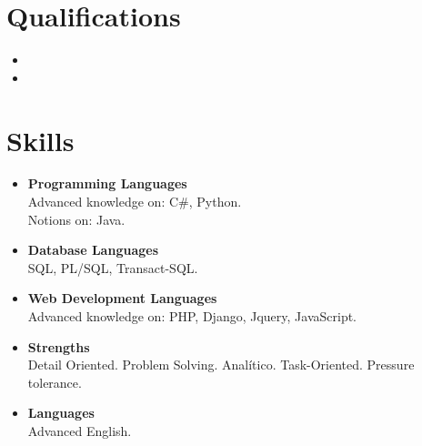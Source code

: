 \documentclass[11pt,a4paper,roman]{moderncv}        %
\begin{document}
\section{Qualifications}

\vspace{3pt}

\begin{itemize}

\item{}

\item{}

\end{itemize}

\section{Skills}

\vspace{3pt}

\begin{itemize}

\item \textbf{Programming Languages} \\Advanced knowledge on: C\#, Python. \\Notions on: Java.

\vspace{3pt}

\item \textbf{Database Languages} \\SQL, PL/SQL, Transact-SQL.

\vspace{3pt}

\item \textbf{Web Development Languages} \\Advanced knowledge on: PHP, Django, Jquery, JavaScript.

\vspace{3pt}

\item \textbf{Strengths} \\Detail Oriented. Problem Solving. Analítico. Task-Oriented. Pressure tolerance.

\vspace{3pt}

\item \textbf{Languages} \\Advanced English.

\end{itemize}
\end{document}
